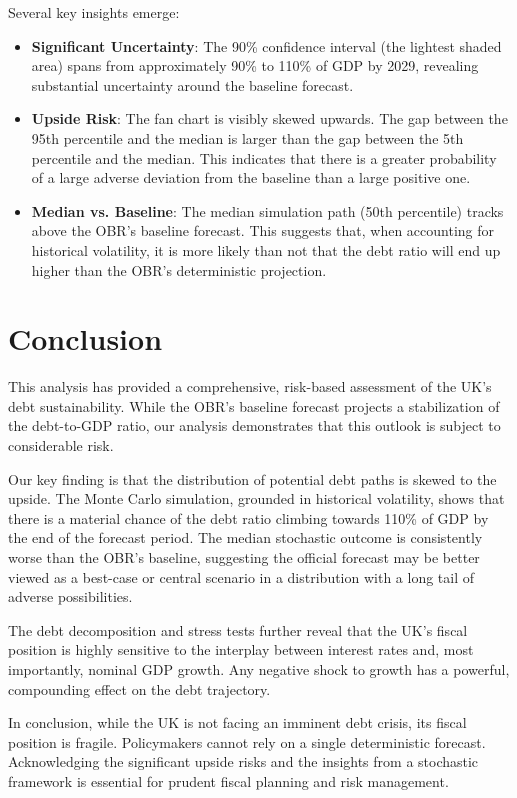 \documentclass[12pt, a4paper]{article}
\begin{document}
Several key insights emerge:
\begin{itemize}
    \item \textbf{Significant Uncertainty}: The 90\% confidence interval (the lightest shaded area) spans from approximately 90\% to 110\% of GDP by 2029, revealing substantial uncertainty around the baseline forecast.
    \item \textbf{Upside Risk}: The fan chart is visibly skewed upwards. The gap between the 95th percentile and the median is larger than the gap between the 5th percentile and the median. This indicates that there is a greater probability of a large adverse deviation from the baseline than a large positive one.
    \item \textbf{Median vs. Baseline}: The median simulation path (50th percentile) tracks above the OBR's baseline forecast. This suggests that, when accounting for historical volatility, it is more likely than not that the debt ratio will end up higher than the OBR's deterministic projection.
\end{itemize}

\section{Conclusion}
This analysis has provided a comprehensive, risk-based assessment of the UK's debt sustainability. While the OBR's baseline forecast projects a stabilization of the debt-to-GDP ratio, our analysis demonstrates that this outlook is subject to considerable risk.

Our key finding is that the distribution of potential debt paths is skewed to the upside. The Monte Carlo simulation, grounded in historical volatility, shows that there is a material chance of the debt ratio climbing towards 110\% of GDP by the end of the forecast period. The median stochastic outcome is consistently worse than the OBR's baseline, suggesting the official forecast may be better viewed as a best-case or central scenario in a distribution with a long tail of adverse possibilities.

The debt decomposition and stress tests further reveal that the UK's fiscal position is highly sensitive to the interplay between interest rates and, most importantly, nominal GDP growth. Any negative shock to growth has a powerful, compounding effect on the debt trajectory.

In conclusion, while the UK is not facing an imminent debt crisis, its fiscal position is fragile. Policymakers cannot rely on a single deterministic forecast. Acknowledging the significant upside risks and the insights from a stochastic framework is essential for prudent fiscal planning and risk management.
\end{document}
